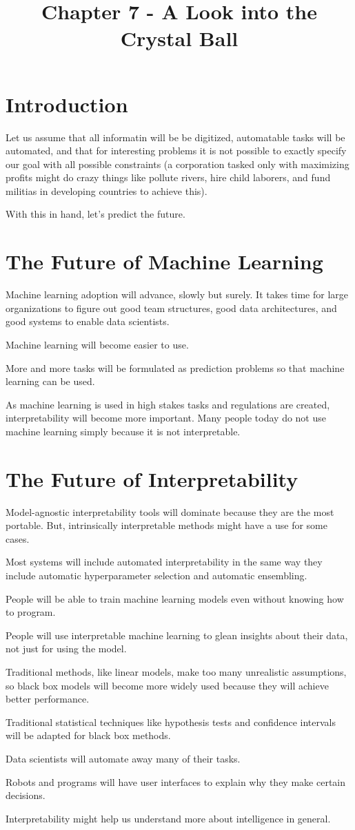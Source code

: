 \documentclass[a4paper]{article}
\title{Chapter 7 - A Look into the Crystal Ball}
\date{}
\begin{document}
\maketitle

\section{Introduction}
Let us assume that all informatin will be be digitized, automatable tasks will
be automated, and that for interesting problems it is not possible to exactly
specify our goal with all possible constraints (a corporation tasked only
with maximizing profits might do crazy things like pollute rivers, hire child
laborers, and fund militias in developing countries to achieve this).

With this in hand, let's predict the future.

\section{The Future of Machine Learning}
Machine learning adoption will advance, slowly but surely. It takes time for
large organizations to figure out good team structures, good data architectures,
and good systems to enable data scientists.

Machine learning will become easier to use.

More and more tasks will be formulated as prediction problems so that machine
learning can be used.

As machine learning is used in high stakes tasks and regulations are created,
interpretability will become more important. Many people today do not use machine
learning simply because it is not interpretable.

\section{The Future of Interpretability}
Model-agnostic interpretability tools will dominate because they are the most
portable. But, intrinsically interpretable methods might have a use for some
cases.

Most systems will include automated interpretability in the same way they
include automatic hyperparameter selection and automatic ensembling.

People will be able to train machine learning models even without knowing how to
program.

People will use interpretable machine learning to glean insights about their
data, not just for using the model.

Traditional methods, like linear models, make too many unrealistic assumptions,
so black box models will become more widely used because they will achieve
better performance.

Traditional statistical techniques like hypothesis tests and confidence intervals
will be adapted for black box methods.

Data scientists will automate away many of their tasks.

Robots and programs will have user interfaces to explain why they make certain
decisions.

Interpretability might help us understand more about intelligence in general.
\end{document}

